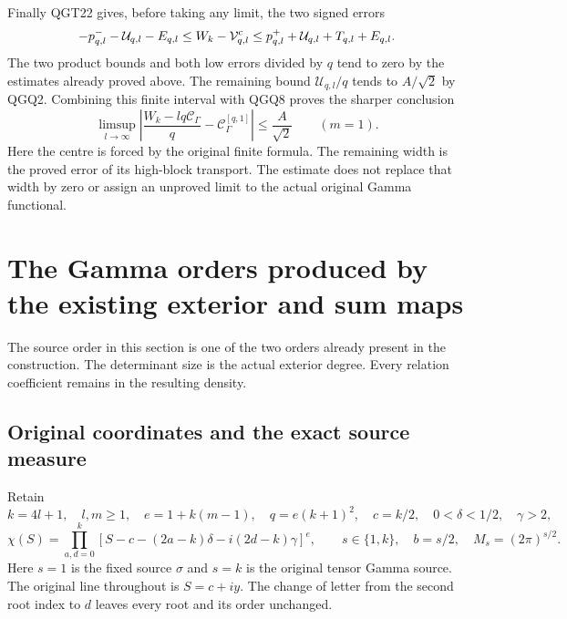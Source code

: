 \documentclass[11pt,a4paper]{article}
\begin{document}
Finally QGT22 gives, before taking any limit, the two signed errors
\[
 -p^-_{q,l}-\mathcal U_{q,l}-E_{q,l}
 \le W_k-\mathcal V^{\rm c}_{q,l}
 \le p^+_{q,l}+\mathcal U_{q,l}+T_{q,l}+E_{q,l}.
\]
The two product bounds and both low errors divided by $q$ tend to
zero by the estimates already proved above. The remaining bound
$\mathcal U_{q,l}/q$ tends to $A/\sqrt2$ by QGQ2.
Combining this finite interval with QGQ8 proves the sharper conclusion
\[
 \boxed{\displaystyle
 \limsup_{l\to\infty}
 \left|\frac{W_k-lq\mathcal C_\Gamma}{q}
                  -\mathcal C_\Gamma^{[q,1]}\right|
                           \le\frac A{\sqrt2}\qquad(m=1).}
 \tag{QGQ9}
\]
Here the centre is forced by the original finite formula. The remaining
width is the proved error of its high-block transport. The estimate
does not replace that width by zero or assign an unproved limit to
the actual original Gamma functional.


\clearpage

\section{The Gamma orders produced by the existing exterior and sum maps}
\label{sec:IGO}

The source order in this section is one of the two orders already present
in the construction. The determinant size is the actual exterior degree.
Every relation coefficient remains in the resulting density.

\subsection{Original coordinates and the exact source measure}
Retain
\[
 k=4l+1,\quad l,m\geq1,\quad e=1+k(m-1),\quad
 q=e(k+1)^2,\quad c=k/2,\quad
 0<\delta<1/2,\quad\gamma>2,
\]
\[
 \chi(S)=\prod_{a,d=0}^{k}
 [S-c-(2a-k)\delta-i(2d-k)\gamma]^e,
 \qquad s\in\{1,k\},\quad b=s/2,\quad M_s=(2\pi)^{s/2}.
 \tag{IGO1}
\]
Here $s=1$ is the fixed source $\sigma$ and $s=k$ is the original
tensor Gamma source. The original line throughout is $S=c+iy$.
The change of letter from the second root index to $d$ leaves every
root and its order unchanged.
\end{document}
